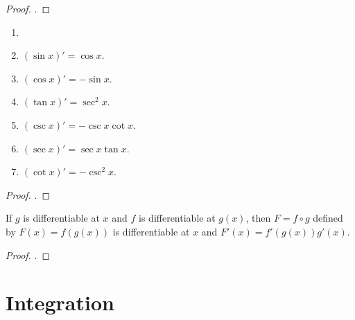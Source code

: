         \begin{proof}
            .
        \end{proof}
        
        \begin{thm} \label{thm_derivative_trig}
            \begin{enumerate} \item[]
                \item $(\sin x)' = \cos x$.
                \item $(\cos x)' = -\sin x$.
                \item $(\tan x)' = \sec^2 x$.
                \item $(\csc x)' = -\csc x \cot x$.
                \item $(\sec x)' = \sec x \tan x$.
                \item $(\cot x)' = -\csc^2 x$.
            \end{enumerate}
        \end{thm}
        
        \begin{proof}
            .
        \end{proof}
        
        \begin{thm} \label{thm_chain_rule}
            If $g$ is differentiable at $x$ and $f$ is differentiable at $g(x)$, then $F = f \circ g$ defined by $F(x) = f(g(x))$ is differentiable at $x$ and $F'(x) = f'(g(x))g'(x)$.
        \end{thm}
        
        \begin{proof}
            .
        \end{proof}
    
    \section{Integration}

